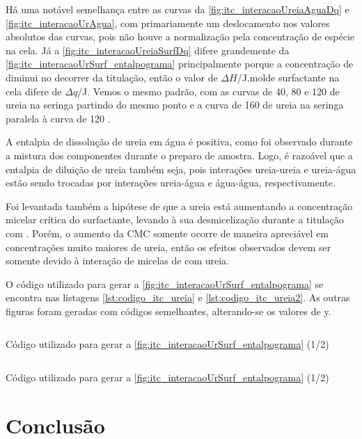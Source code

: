 	Há uma notável semelhança entre as curvas da \autoref{fig:itc_interacaoUreiaAguaDq} e \autoref{fig:itc_interacaoUrAgua}, com primariamente um deslocamento nos valores absolutos das curvas, pois não houve a normalização pela concentração de espécie na cela. Já a \autoref{fig:itc_interacaoUreiaSurfDq} difere grandemente da \autoref{fig:itc_interacaoUrSurf_entalpograma} principalmente porque a concentração de \TTAB{} diminui no decorrer da titulação, então o valor de \(\Delta H\)/J.mol\menosUm de surfactante na cela difere de \(\Delta q\)/J. Vemos o mesmo padrão, com as curvas de 40, 80 e 120 \mM{} de ureia na seringa partindo do mesmo ponto e a curva de 160 \mM{} de ureia na seringa paralela à curva de 120 \mM.
	
	A entalpia de dissolução de ureia em água é positiva, como foi observado durante a mistura dos componentes durante o preparo de amostra. Logo, é razoável que a entalpia de diluição de ureia também seja, pois interações ureia-ureia e ureia-água estão sendo trocadas por interações ureia-água e água-água, respectivamente.
	
	Foi levantada também a hipótese de que a ureia está aumentando a concentração micelar crítica do surfactante, levando à sua desmicelização durante a titulação com \TTAB{}. Porém, o aumento da CMC somente ocorre de maneira apreciável em concentrações muito maiores de ureia, então os efeitos observados devem ser somente devido à interação de micelas de \TTAB{} com ureia.
	
	O código utilizado para gerar a \autoref{fig:itc_interacaoUrSurf_entalpograma} se encontra nas listagens \ref{lst:codigo_itc_ureia} e \ref{lst:codigo_itc_ureia2}. As outras figuras foram geradas com códigos semelhantes, alterando-se os valores de y.
	
	\begin{listing}[h]
		\inputminted{python}{./python/ITC_tratamento_ureia_ttab.py}
		\caption{Código utilizado para gerar a \autoref{fig:itc_interacaoUrSurf_entalpograma} (1/2)}
		\label{lst:codigo_itc_ureia}
	\end{listing}

	\begin{listing}[h]
		\inputminted{python}{./python/ITC_tratamento_ureia_ttab2.py}
		\caption{Código utilizado para gerar a \autoref{fig:itc_interacaoUrSurf_entalpograma} (1/2)}
		\label{lst:codigo_itc_ureia2}
	\end{listing}


	\FloatBarrier
	
	\section{Conclusão} 
	
